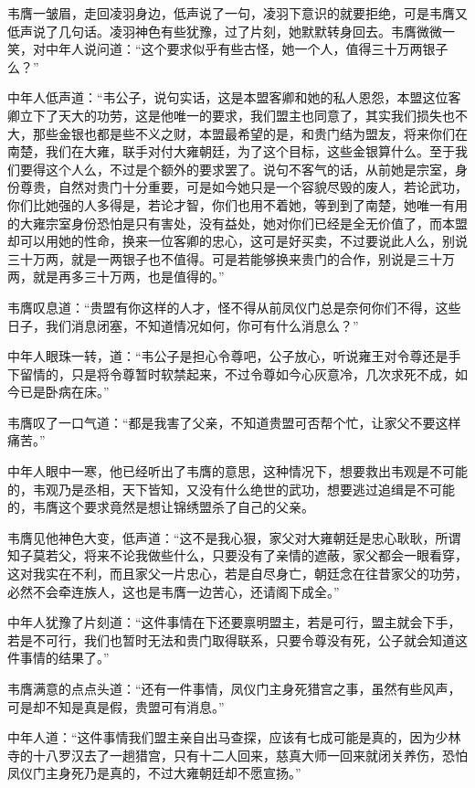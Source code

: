韦膺一皱眉，走回凌羽身边，低声说了一句，凌羽下意识的就要拒绝，可是韦膺又低声说了几句话。凌羽神色有些犹豫，过了片刻，她默默转身回去。韦膺微微一笑，对中年人说问道：“这个要求似乎有些古怪，她一个人，值得三十万两银子么？”

中年人低声道：“韦公子，说句实话，这是本盟客卿和她的私人恩怨，本盟这位客卿立下了天大的功劳，这是他唯一的要求，我们盟主也同意了，其实我们损失也不大，那些金银也都是些不义之财，本盟最希望的是，和贵门结为盟友，将来你们在南楚，我们在大雍，联手对付大雍朝廷，为了这个目标，这些金银算什么。至于我们要得这个人么，不过是个额外的要求罢了。说句不客气的话，从前她是宗室，身份尊贵，自然对贵门十分重要，可是如今她只是一个容貌尽毁的废人，若论武功，你们比她强的人多得是，若论才智，你们也用不着她，等到到了南楚，她唯一有用的大雍宗室身份恐怕是只有害处，没有益处，她对你们已经是全无价值了，而本盟却可以用她的性命，换来一位客卿的忠心，这可是好买卖，不过要说此人么，别说三十万两，就是一两银子也不值得。可是若能够换来贵门的合作，别说是三十万两，就是再多三十万两，也是值得的。”

韦膺叹息道：“贵盟有你这样的人才，怪不得从前凤仪门总是奈何你们不得，这些日子，我们消息闭塞，不知道情况如何，你可有什么消息么？”

中年人眼珠一转，道：“韦公子是担心令尊吧，公子放心，听说雍王对令尊还是手下留情的，只是将令尊暂时软禁起来，不过令尊如今心灰意冷，几次求死不成，如今已是卧病在床。”

韦膺叹了一口气道：“都是我害了父亲，不知道贵盟可否帮个忙，让家父不要这样痛苦。”

中年人眼中一寒，他已经听出了韦膺的意思，这种情况下，想要救出韦观是不可能的，韦观乃是丞相，天下皆知，又没有什么绝世的武功，想要逃过追缉是不可能的，韦膺这个要求竟然是想让锦绣盟杀了自己的父亲。

韦膺见他神色大变，低声道：“这不是我心狠，家父对大雍朝廷是忠心耿耿，所谓知子莫若父，将来不论我做些什么，只要没有了亲情的遮蔽，家父都会一眼看穿，这对我实在不利，而且家父一片忠心，若是自尽身亡，朝廷念在往昔家父的功劳，必然不会牵连族人，这也是韦膺一边苦心，还请阁下成全。”

中年人犹豫了片刻道：“这件事情在下还要禀明盟主，若是可行，盟主就会下手，若是不可行，我们也暂时无法和贵门取得联系，只要令尊没有死，公子就会知道这件事情的结果了。”

韦膺满意的点点头道：“还有一件事情，凤仪门主身死猎宫之事，虽然有些风声，可是却不知是真是假，贵盟可有消息。”

中年人道：“这件事情我们盟主亲自出马查探，应该有七成可能是真的，因为少林寺的十八罗汉去了一趟猎宫，只有十二人回来，慈真大师一回来就闭关养伤，恐怕凤仪门主身死乃是真的，不过大雍朝廷却不愿宣扬。”

